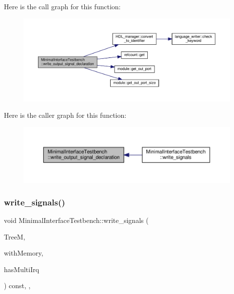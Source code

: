 Here is the call graph for this function\+:
\nopagebreak
\begin{figure}[H]
\begin{center}
\leavevmode
\includegraphics[width=350pt]{d0/dba/classMinimalInterfaceTestbench_a491e3de9b0dd7e94c304f15211d939e7_cgraph}
\end{center}
\end{figure}
Here is the caller graph for this function\+:
\nopagebreak
\begin{figure}[H]
\begin{center}
\leavevmode
\includegraphics[width=350pt]{d0/dba/classMinimalInterfaceTestbench_a491e3de9b0dd7e94c304f15211d939e7_icgraph}
\end{center}
\end{figure}
\mbox{\label{classMinimalInterfaceTestbench_ae769d22c64fd7d99cbfb435881cc0fc0}} 
\subsubsection{\texorpdfstring{write\+\_\+signals()}{write\_signals()}}
{\footnotesize\ttfamily void Minimal\+Interface\+Testbench\+::write\+\_\+signals (\begin{DoxyParamCaption}\item[{const \hyperlink{tree__manager_8hpp_a792e3f1f892d7d997a8d8a4a12e39346}{tree\+\_\+manager\+Const\+Ref}}]{TreeM,  }\item[{bool \&}]{with\+Memory,  }\item[{bool \&}]{has\+Multi\+Irq }\end{DoxyParamCaption}) const\hspace{0.3cm}{\ttfamily [override]}, {\ttfamily [protected]}, {\ttfamily [virtual]}}



